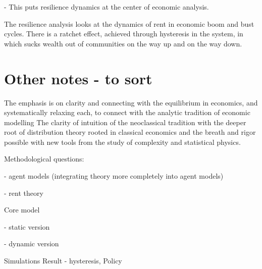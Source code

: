 - This puts resilience dynamics at the center of economic analysis.

The resilience analysis looks at the dynamics of rent in economic boom and bust cycles.
There is a ratchet effect, achieved through hysteresis in the system, in which sucks wealth out of communities on the way up and on the way down. %


\section{Other notes - to sort}


The emphasis is on clarity and connecting with the equilibrium in economics, and systematically relaxing each, to connect with the analytic tradition of economic modelling
The clarity of intuition of the neoclassical tradition with the deeper root of distribution theory rooted in classical economics and the breath and rigor possible with new tools from the study of complexity and statistical physics.

Methodological questions: 

    - agent models (integrating theory more completely into agent models)
    
    - rent theory

Core model

    - static version
    
    - dynamic version

Simulations
Result - hysteresis,
Policy
